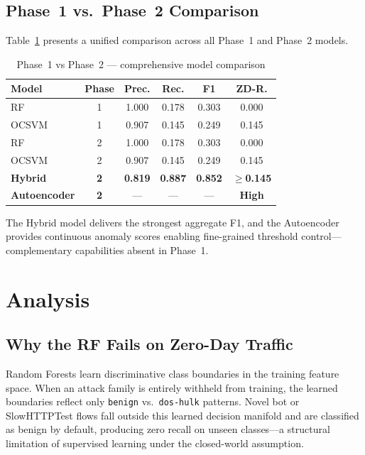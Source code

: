 \documentclass[10pt,conference]{IEEEtran}
\begin{document}
\subsection{Phase~1 vs.\ Phase~2 Comparison}

Table~\ref{tab:comparison} presents a unified comparison across all
Phase~1 and Phase~2 models.

\begin{table}[htbp]
\centering
\caption{Phase~1 vs Phase~2 — comprehensive model comparison}
\label{tab:comparison}
\begin{tabular}{lccccc}
\toprule
\textbf{Model} & \textbf{Phase} & \textbf{Prec.} & \textbf{Rec.} & \textbf{F1} & \textbf{ZD-R.} \\
\midrule
RF        & 1 & 1.000 & 0.178 & 0.303 & 0.000 \\
OCSVM     & 1 & 0.907 & 0.145 & 0.249 & 0.145 \\
RF        & 2 & 1.000 & 0.178 & 0.303 & 0.000 \\
OCSVM     & 2 & 0.907 & 0.145 & 0.249 & 0.145 \\
\textbf{Hybrid} & \textbf{2} & \textbf{0.819} & \textbf{0.887} & \textbf{0.852} & $\mathbf{\geq}$\textbf{0.145} \\
\textbf{Autoencoder} & \textbf{2} & --- & --- & --- & \textbf{High} \\
\bottomrule
\end{tabular}
\end{table}

The Hybrid model delivers the strongest aggregate F1, and the
Autoencoder provides continuous anomaly scores enabling fine-grained
threshold control—complementary capabilities absent in Phase~1.

\section{Analysis}
\label{sec:analysis}

\subsection{Why the RF Fails on Zero-Day Traffic}

Random Forests learn discriminative class boundaries in the training
feature space. When an attack family is entirely withheld from
training, the learned boundaries reflect only \texttt{benign}
vs.\ \texttt{dos-hulk} patterns. Novel bot or SlowHTTPTest flows
fall outside this learned decision manifold and are classified as
benign by default, producing zero recall on unseen classes—a
structural limitation of supervised learning under the closed-world
assumption.
\end{document}
